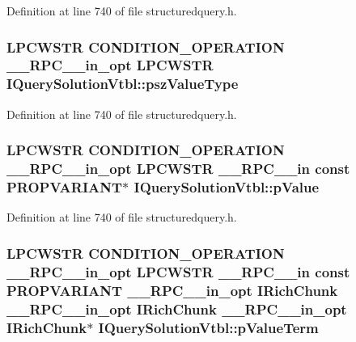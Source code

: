 Definition at line 740 of file structuredquery.\+h.

\subsubsection[{\texorpdfstring{psz\+Value\+Type}{pszValueType}}]{ {\bf L\+P\+C\+W\+S\+TR} {\bf C\+O\+N\+D\+I\+T\+I\+O\+N\+\_\+\+O\+P\+E\+R\+A\+T\+I\+ON} {\bf \+\_\+\+\_\+\+R\+P\+C\+\_\+\+\_\+in\+\_\+opt} {\bf L\+P\+C\+W\+S\+TR} I\+Query\+Solution\+Vtbl\+::psz\+Value\+Type}\hypertarget{struct_i_query_solution_vtbl_aec5b65ff202116ca6656e19a143a483a}{}\label{struct_i_query_solution_vtbl_aec5b65ff202116ca6656e19a143a483a}


Definition at line 740 of file structuredquery.\+h.

\subsubsection[{\texorpdfstring{p\+Value}{pValue}}]{ {\bf L\+P\+C\+W\+S\+TR} {\bf C\+O\+N\+D\+I\+T\+I\+O\+N\+\_\+\+O\+P\+E\+R\+A\+T\+I\+ON} {\bf \+\_\+\+\_\+\+R\+P\+C\+\_\+\+\_\+in\+\_\+opt} {\bf L\+P\+C\+W\+S\+TR} {\bf \+\_\+\+\_\+\+R\+P\+C\+\_\+\+\_\+in} {\bf const} {\bf P\+R\+O\+P\+V\+A\+R\+I\+A\+NT}$\ast$ I\+Query\+Solution\+Vtbl\+::p\+Value}\hypertarget{struct_i_query_solution_vtbl_aa4ef20da27161910b208eb9cfa491f78}{}\label{struct_i_query_solution_vtbl_aa4ef20da27161910b208eb9cfa491f78}


Definition at line 740 of file structuredquery.\+h.

\subsubsection[{\texorpdfstring{p\+Value\+Term}{pValueTerm}}]{ {\bf L\+P\+C\+W\+S\+TR} {\bf C\+O\+N\+D\+I\+T\+I\+O\+N\+\_\+\+O\+P\+E\+R\+A\+T\+I\+ON} {\bf \+\_\+\+\_\+\+R\+P\+C\+\_\+\+\_\+in\+\_\+opt} {\bf L\+P\+C\+W\+S\+TR} {\bf \+\_\+\+\_\+\+R\+P\+C\+\_\+\+\_\+in} {\bf const} {\bf P\+R\+O\+P\+V\+A\+R\+I\+A\+NT} {\bf \+\_\+\+\_\+\+R\+P\+C\+\_\+\+\_\+in\+\_\+opt} {\bf I\+Rich\+Chunk} {\bf \+\_\+\+\_\+\+R\+P\+C\+\_\+\+\_\+in\+\_\+opt} {\bf I\+Rich\+Chunk} {\bf \+\_\+\+\_\+\+R\+P\+C\+\_\+\+\_\+in\+\_\+opt} {\bf I\+Rich\+Chunk}$\ast$ I\+Query\+Solution\+Vtbl\+::p\+Value\+Term}\hypertarget{struct_i_query_solution_vtbl_a23a2545ffe3f516f118285f7329a0386}{}\label{struct_i_query_solution_vtbl_a23a2545ffe3f516f118285f7329a0386}


